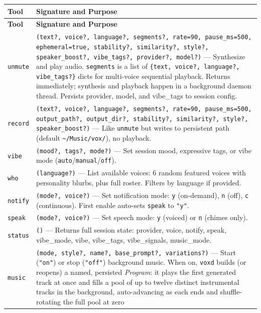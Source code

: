 \documentclass[a4paper,10pt]{article}
\newcommand{\tool}[1]{\texttt{#1}}
\newcommand{\field}[1]{\texttt{#1}}
\begin{document}
\begin{center}
\begin{longtable}{lp{8.5cm}}
\toprule
\textbf{Tool} & \textbf{Signature and Purpose} \\
\midrule
\endfirsthead
\toprule
\textbf{Tool} & \textbf{Signature and Purpose} \\
\midrule
\endhead
\tool{unmute} & \texttt{(text?, voice?, language?, segments?,
  rate=90, pause\_ms=500, ephemeral=true, stability?, similarity?,
  style?, speaker\_boost?, vibe\_tags?, provider?, model?)} ---
  Synthesize and play audio.  \field{segments} is a list of
  \texttt{\{text, voice?, language?, vibe\_tags?\}} dicts for
  multi-voice sequential playback.  Returns immediately; synthesis
  and playback happen in a background daemon thread.  Persists
  provider, model, and vibe\_tags to session config. \\
\tool{record} & \texttt{(text?, voice?, language?, segments?,
  rate=90, pause\_ms=500, output\_path?, output\_dir?,
  stability?, similarity?, style?, speaker\_boost?)} --- Like
  \tool{unmute} but writes to persistent path (default
  \texttt{\~{}/Music/vox/}), no playback. \\
\tool{vibe}   & \texttt{(mood?, tags?, mode?)} --- Set session
  mood, expressive tags, or vibe mode
  (\texttt{auto}/\texttt{manual}/\texttt{off}). \\
\tool{who}    & \texttt{(language?)} --- List available voices:
  6 random featured voices with personality blurbs, plus full
  roster.  Filters by language if provided. \\
\tool{notify} & \texttt{(mode?, voice?)} --- Set notification
  mode: \texttt{y} (on-demand), \texttt{n} (off), \texttt{c}
  (continuous).  First enable auto-sets \field{speak} to
  \texttt{"y"}. \\
\tool{speak}  & \texttt{(mode?, voice?)} --- Set speech mode:
  \texttt{y} (voiced) or \texttt{n} (chimes only). \\
\tool{status} & \texttt{()} --- Returns full session state:
  provider, voice, notify, speak, vibe\_mode, vibe, vibe\_tags,
  vibe\_signals, music\_mode. \\
\tool{music} & \texttt{(mode, style?, name?, base\_prompt?, variations?)}
  --- Start (\texttt{"on"}) or stop (\texttt{"off"}) background music.
  When on, \texttt{voxd} builds (or reopens) a named, persisted
  \emph{Program}: it plays the first generated track at once and fills a
  pool of up to twelve distinct instrumental tracks in the background,
  auto-advancing as each ends and shuffle-rotating the full pool at zero

\end{longtable}
\end{center}
\end{document}
